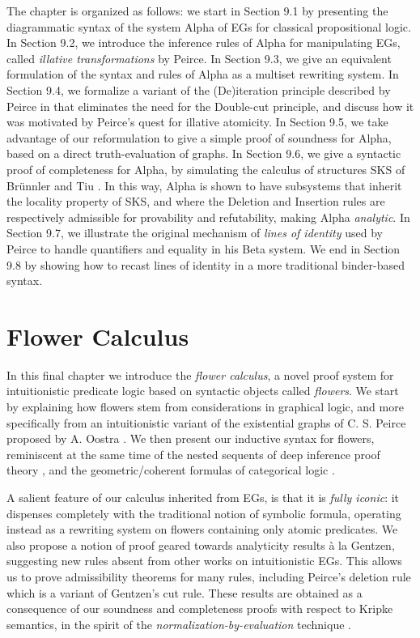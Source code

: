 \documentclass[11pt]{article}
\begin{document}
The chapter is organized as follows: we start in Section 9.1 by presenting
the diagrammatic syntax of the system Alpha of EGs for
classical propositional logic. In Section 9.2, we introduce the
inference rules of Alpha for manipulating EGs, called
\emph{illative transformations} by Peirce. In Section 9.3, we give
an equivalent formulation of the syntax and rules of Alpha as a
multiset rewriting system. In Section 9.4, we formalize a
variant of the (De)iteration principle described by Peirce in
\cite{peirce_prolegomena_1906} that eliminates the need for the
Double-cut principle, and discuss how it was motivated by Peirce's quest
for illative atomicity. In Section 9.5, we take advantage
of our reformulation to give a simple proof of soundness for Alpha, based
on a direct truth-evaluation of graphs. In Section 9.6, we give a
syntactic proof of completeness for Alpha, by simulating the calculus
of structures SKS of Brünnler and Tiu \cite{brunnler_local_2001}. In
this way, Alpha is shown to have subsystems that inherit the
locality property of SKS, and where the Deletion and
Insertion rules are respectively admissible for provability and
refutability, making Alpha \emph{analytic}. In Section 9.7,
we illustrate the original mechanism of \emph{lines of identity} used by
Peirce to handle quantifiers and equality in his Beta system. We end in
Section 9.8 by showing how to recast lines of identity in a more
traditional binder-based syntax.

\section{Flower Calculus}

In this final chapter we introduce the \emph{flower calculus}, a novel proof system for
intuitionistic predicate logic based on syntactic objects called
\emph{flowers}. We start by explaining how flowers stem from considerations in
graphical logic, and more specifically from an intuitionistic variant of
the existential graphs of C. S. Peirce proposed by A. Oostra \cite{oostra_graficos_2010,oostra_graficos_2011,zalamea_advances_2022}. We then
present our inductive syntax for flowers, reminiscent at the same time of the
nested sequents of deep inference proof theory \cite{brunnler_deep_2009,fitting-nested-2014,guenot_nested_2013,lyon_nested_2021}, and the
geometric/coherent formulas of categorical logic \cite{skolem_geometric,negri_geometric,Johnstone2002-rm}.

A salient feature of our calculus inherited from EGs, is that it is
\emph{fully iconic}: it dispenses completely with the traditional notion of
symbolic formula, operating instead as a rewriting system on flowers
containing only atomic predicates. We also propose a notion of proof geared
towards analyticity results à la Gentzen, suggesting new rules absent from
other works on intuitionistic EGs. This allows us to prove
admissibility theorems for many rules, including Peirce's deletion rule which is
a variant of Gentzen's cut rule. These results are obtained as a consequence of
our soundness and completeness proofs with respect to Kripke semantics, in the
spirit of the \emph{normalization-by-evaluation} technique \cite{NbE}.
\end{document}
